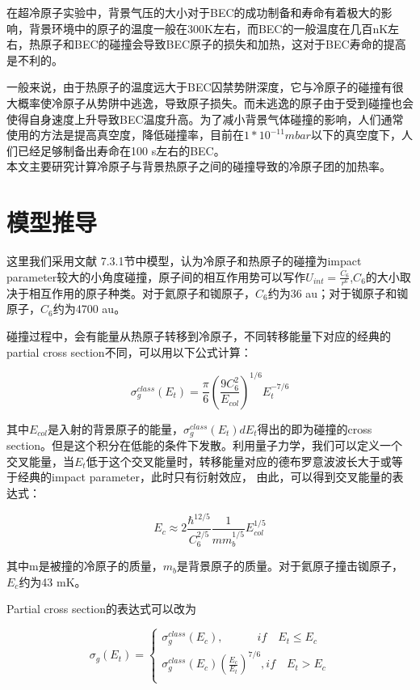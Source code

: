 \documentclass[onecolumn,a4paper,10pt,plain]{article}
\begin{document}
在超冷原子实验中，背景气压的大小对于BEC的成功制备和寿命有着极大的影响，背景环境中的原子的温度一般在300K左右，而BEC的一般温度在几百nK左右，热原子和BEC的碰撞会导致BEC原子的损失和加热，这对于BEC寿命的提高是不利的。

一般来说，由于热原子的温度远大于BEC囚禁势阱深度，它与冷原子的碰撞有很大概率使冷原子从势阱中逃逸，导致原子损失。而未逃逸的原子由于受到碰撞也会使得自身速度上升导致BEC温度升高。为了减小背景气体碰撞的影响，人们通常使用的方法是提高真空度，降低碰撞率，目前在$1*10^{-11}mbar$以下的真空度下，人们已经足够制备出寿命在100 s左右的BEC。\\

本文主要研究计算冷原子与背景热原子之间的碰撞导致的冷原子团的加热率。

\section{模型推导}

这里我们采用文献\cite{mc1} 7.3.1节中模型，认为冷原子和热原子的碰撞为impact parameter较大的小角度碰撞，原子间的相互作用势可以写作$U_{int} = \frac{C_6}{ r^6}$,$C_6$的大小取决于相互作用的原子种类。对于氦原子和铷原子，$C_6$约为36 au；对于铷原子和铷原子，$C_6$约为4700 au。

碰撞过程中，会有能量从热原子转移到冷原子，不同转移能量下对应的经典的partial cross  section不同，可以用以下公式计算：

\begin{equation}
\sigma^{class}_g (E_t)=\frac{\pi}{6}(\frac{9C^2_6}{E_{col}})^{1/6}E^{-7/6}_t
\end{equation}

其中$E_{col}$是入射的背景原子的能量，$\sigma^{class}_g (E_t)d E_t$得出的即为碰撞的cross section。但是这个积分在低能的条件下发散。利用量子力学，我们可以定义一个交叉能量，当$E_t$低于这个交叉能量时，转移能量对应的德布罗意波波长大于或等于经典的impact parameter，此时只有衍射效应， 由此，可以得到交叉能量的表达式：

\begin{equation}
E_c\approx 2\frac{{\hbar}^{12/5}}{C^{2/5}_6}\frac{1}{m m^{1/5}_b}E^{1/5}_{col}
\end{equation}

其中m是被撞的冷原子的质量，$m_b$是背景原子的质量。对于氦原子撞击铷原子，$E_c$约为43 mK。

Partial cross section的表达式可以改为

\begin{equation}
\sigma_g (E_t)= \left\{ 
\begin{array}{l}
\sigma^{class}_g (E_c), \qquad \quad if  \quad E_t\leqslant E_c\\
\sigma^{class}_g (E_c) {(\frac{E_c}{E_t})}^{7/6}, if  \quad E_t >  E_c\\
\end{array}
\right.
\end{equation}
\end{document}
